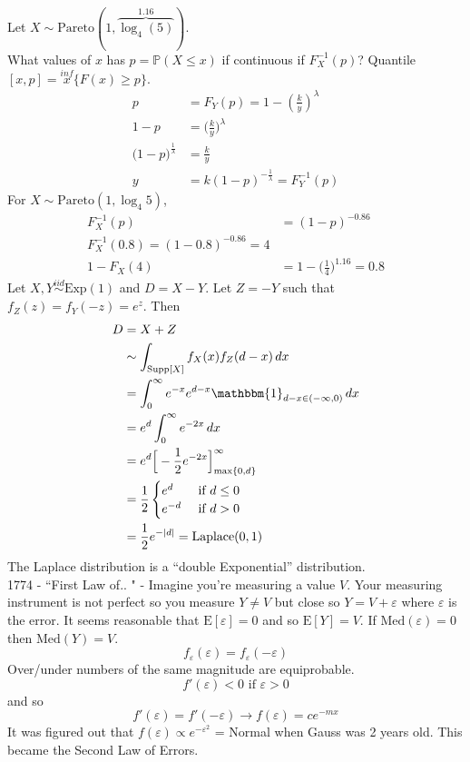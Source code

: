 \documentclass[12pt]{article}
\newcommand{\prob}[1]{\mathbb{P}(#1)}
\newcommand{\indicator}[1]{\mathbbm{1}_{#1}}
\newcommand{\iid}{\stackrel{iid}{\sim}}
\newcommand{\supp}[1]{\text{Supp}[ #1 ]}
\newcommand{\expected}[1]{\mathrm{E}[#1]}
\renewcommand{\max}[1]{\text{max}\{#1\}}
\begin{document}
Let $X \sim \text{Pareto}(1, \overbrace{\log_4(5)}^{1.16})$.  \\ What values of $x$ has $p = \prob{X \leq x}$ if continuous if $F_X^{-1}(p)$? Quantile$[x, p] = \overset{inf}{x} \{F(x) \geq p\}$.
$$\begin{aligned} p &= F_Y(p) = 1 - (\frac{k}{y})^\lambda \\ 1 - p &= \Big(\frac{k}{y}\Big)^\lambda \\ \Big(1 - p\Big)^{\frac{1}{\lambda}} &= \frac{k}{y} \\ y &= k(1 - p)^{-\frac{1}{\lambda}} = F_Y^{-1}(p) \end{aligned} $$ For $X \sim \text{Pareto}(1, \log_4 5)$, $$\begin{aligned} F_X^{-1}(p) &= (1 - p)^{-0.86} \\ F_X^{-1}(0.8) = (1 - 0.8)^{-0.86} = 4 \\ 1 - F_X(4) &= 1 - \Big( \frac{1}{4}\Big)^{1.16} = 0.8 \end{aligned} $$ 
Let $X, Y \iid \text{Exp}(1)$ and $D = X - Y$. Let $Z = -Y$ such that $f_Z(z) = f_Y(-z) = e^z$. Then $$\begin{aligned} D &= X + Z \\ &\sim \int_{\supp{X}} f_X(x) f_Z(d - x) \, dx \\ &= \int_0^\infty e^{-x} e^{d - x} \indicator{d - x \in (-\infty, 0)} \, dx \\ &= e^d \int_0^\infty e^{-2x} \, dx \\ &= e^d \Big[ -\frac{1}{2}e^{-2x}\Big]_{\max{0, d}}^\infty \\ &= \frac{1}{2} \begin{cases} e^d &\text{ if } d \leq 0 \\ e^{-d} &\text{ if } d > 0 \end{cases} \\ &= \frac{1}{2} e^{-|d|} = \text{Laplace}(0, 1) \end{aligned} $$ 
The Laplace distribution is a ``double Exponential'' distribution. \\
1774 - ``First Law of.. " - Imagine you're measuring a value $V$. Your measuring instrument is not perfect so you measure $Y \neq V$ but close so $Y = V + \varepsilon$ where $\varepsilon$ is the error. It seems reasonable that $\expected{\varepsilon} = 0$ and so $\expected{Y} = V$. If $\text{Med}(\varepsilon) = 0$ then $\text{Med}(Y) = V$. $$f_\varepsilon(\varepsilon) = f_\varepsilon(-\varepsilon)$$ Over/under numbers of the same magnitude are equiprobable. 
$$f'(\varepsilon) < 0 \text{ if } \varepsilon > 0$$ and so $$ f'(\varepsilon) = f'(-\varepsilon) \to f(\varepsilon) = ce^{-mx}$$ It was figured out that $f(\varepsilon) \propto e^{-\varepsilon^2}$ = Normal when Gauss was 2 years old. This became the Second Law of Errors. \\~\\
\end{document}
